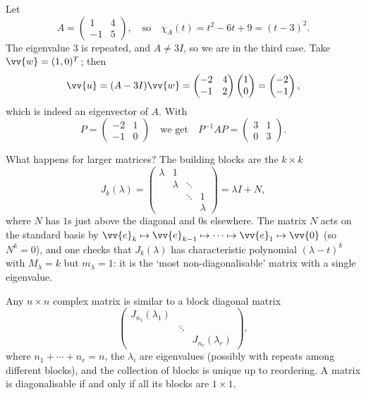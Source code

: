 \begin{example}
	Let
	$$
	A = \begin{pmatrix}
		1 & 4 \\ -1 & 5
	\end{pmatrix}, \quad \text{so} \quad \chi_A(t) = t^2 - 6t + 9 = (t - 3)^2.
	$$
	The eigenvalue $3$ is repeated, and $A \neq 3I$, so we are in the third case. Take $\vv{w} = (1, 0)^T$; then
	$$
	\vv{u} = (A - 3I)\vv{w} = \begin{pmatrix}
		-2 & 4 \\ -1 & 2
	\end{pmatrix}\begin{pmatrix}
		1 \\ 0
	\end{pmatrix} = \begin{pmatrix}
		-2 \\ -1
	\end{pmatrix},
	$$
	which is indeed an eigenvector of $A$. With
	$$
	P = \begin{pmatrix}
		-2 & 1 \\ -1 & 0
	\end{pmatrix} \quad \text{we get} \quad P^{-1}AP = \begin{pmatrix}
		3 & 1 \\ 0 & 3
	\end{pmatrix}.
	$$
\end{example}

What happens for larger matrices? The building blocks are the $k \times k$ 
$$
J_k(\lambda) = \begin{pmatrix}
	\lambda & 1 & & \\
	& \lambda & \ddots & \\
	& & \ddots & 1\\
	& & & \lambda
\end{pmatrix} = \lambda I + N,
$$
where $N$ has $1$s just above the diagonal and $0$s elsewhere. The matrix $N$ acts on the standard basis by $\vv{e}_k \mapsto \vv{e}_{k-1} \mapsto \cdots \mapsto \vv{e}_1 \mapsto \vv{0}$ (so $N^k = 0$), and one checks that $J_k(\lambda)$ has characteristic polynomial $(\lambda - t)^k$ with $M_\lambda = k$ but $m_\lambda = 1$: it is the `most non-diagonalisable' matrix with a single eigenvalue.

\begin{theorem}
	Any $n \times n$ complex matrix is similar to a block diagonal matrix
	$$
	\begin{pmatrix}
		J_{n_1}(\lambda_1) & & \\
		& \ddots & \\
		& & J_{n_r}(\lambda_r)
	\end{pmatrix},
	$$
	where $n_1 + \cdots + n_r = n$, the $\lambda_i$ are eigenvalues (possibly with repeats among different blocks), and the collection of blocks is unique up to reordering. A matrix is diagonalisable if and only if all its blocks are $1 \times 1$.
\end{theorem}

